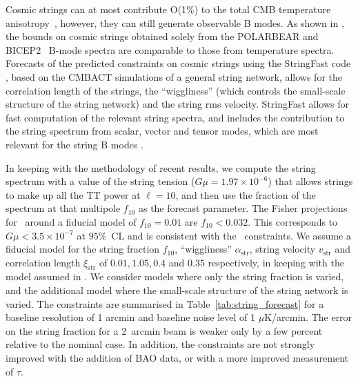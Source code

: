 Cosmic strings can at most contribute O(1\%) to the total CMB temperature anisotropy~\cite{Ade:2013xla,Lizarraga:2014xza,Lazanu:2014eya}, however, they can still generate observable B modes. As shown in \cite{Moss:2014cra}, the bounds on cosmic strings obtained solely from the POLARBEAR \cite{Ade:2014afa} and { BICEP}2~\cite{Ade:2014xna} B-mode spectra are comparable to those from temperature spectra. 
Forecasts of the predicted constraints on cosmic strings using the StringFast code \cite{Foreman:2011uj}, based on the CMBACT simulations \cite{Pogosian:1999np} of a general string network, allows for the correlation length of the strings, the ``wiggliness'' (which controls the small-scale structure of the string network) and the string rms velocity. StringFast allows for fast computation of the relevant string spectra, and includes the contribution to the string spectrum from scalar, vector and tensor modes, which are most relevant for the string B modes \cite{Foreman:2011uj}.

In keeping with the methodology of recent results, we compute the string spectrum with a value of the string tension ($G\mu=1.97\times10^{-6}$) that allows strings to make up all the TT power at $\ell=10$, and then use the fraction of the spectrum at that multipole $f_{10}$ as the forecast parameter. 
The Fisher projections for \planck\ around a fiducial model of $f_{10}=0.01$ are $f_{10}<0.032$. This corresponds to $G\mu < 3.5\times 10^{-7}$ at $95\%$~CL and is consistent with the \planck\ constraints.
We assume a fiducial model for the string fraction $f_{10}$, ``wiggliness'' $\alpha_\mathrm{str}$, string velocity $v_\mathrm{str}$ and correlation length $\xi_\mathrm{str}$ of $0.01, 1.05, 0.4$ and $0.35$ respectively, in keeping with the model assumed in \cite{Foreman:2011uj}. We consider models where only the string fraction is varied, and the additional model where the small-scale structure of the string network is varied. The constraints are summarised in Table~\ref{tab:string_forecast} for a baseline resolution of 1 arcmin and baseline noise level of 1 $\mu$K/arcmin. The error on the string fraction for a \mbox{2 arcmin} beam is weaker only by a few percent relative to the nominal case. In addition, the constraints are not strongly improved with the addition of BAO data, or with a more improved measurement of $\tau$.

